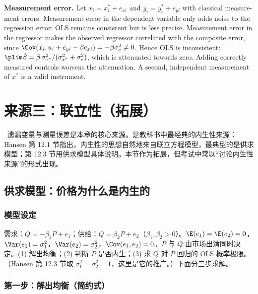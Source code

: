 \begin{english}
\textbf{Measurement error.} Let $x_i=x_i^*+e_{xi}$ and $y_i=y_i^*+e_{yi}$ with classical measurement errors. Measurement error in the dependent variable only adds noise to the regression error: OLS remains consistent but is less precise. Measurement error in the regressor makes the observed regressor correlated with the composite error, since $\Cov(x_i,u_i+e_{yi}-\beta e_{xi})=-\beta\sigma_e^2\neq0$. Hence OLS is inconsistent: $\plim\hat\beta=\beta\,\sigma_{x^*}^2/(\sigma_{x^*}^2+\sigma_e^2)$, which is attenuated towards zero. Adding correctly measured controls worsens the attenuation. A second, independent measurement of $x^*$ is a valid instrument.
\end{english}

\section{来源三：联立性（拓展）}\label{sec:U07-sim}

\tagext\ 遗漏变量与测量误差是本章的核心来源。是教科书中最经典的内生性来源：Hansen 第 12.1 节指出，内生性的思想自然地来自联立方程模型，最典型的是供求模型；第 12.3 节用供求模型具体说明。本节作为拓展，但考试中常以“讨论内生性来源”的形式出现。

\subsection{供求模型：价格为什么是内生的}

\subsubsection{模型设定}

\begin{exmp}[供求模型]\label{ex:U07-sd}
需求：$Q=-\beta_1P+e_1$；供给：$Q=\beta_2P+e_2$（$\beta_1,\beta_2>0$）。$\E(e_1)=\E(e_2)=0$，$\Var(e_1)=\sigma_1^2$，$\Var(e_2)=\sigma_2^2$，$\Cov(e_1,e_2)=0$。$P$ 与 $Q$ 由市场出清同时决定。(1) 解出均衡；(2) 判断 $P$ 是否内生；(3) 求 $Q$ 对 $P$ 回归的 OLS 概率极限。（Hansen 第 12.3 节取 $\sigma_1^2=\sigma_2^2=1$，这里是它的推广。）下面分三步求解。
\end{exmp}

\subsubsection{第一步：解出均衡（简约式）}

